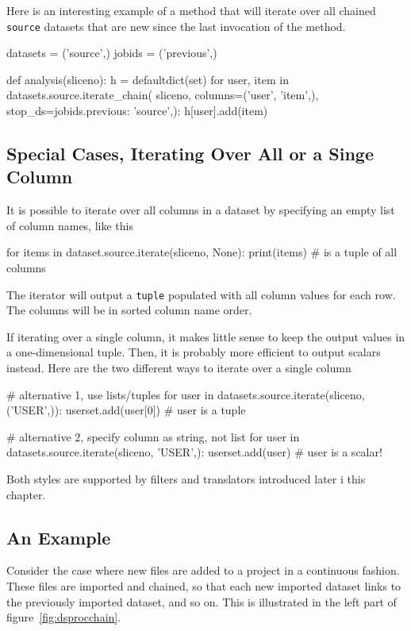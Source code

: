 Here is an interesting example of a method that will iterate over all
chained \texttt{source} datasets that are new since the last
invocation of the method.
\begin{python}
datasets = ('source',)
jobids = ('previous',)

def analysis(sliceno):
    h = defaultdict(set)
    for user, item in datasets.source.iterate_chain(
            sliceno,
            columns=('user', 'item',),
            stop_ds={jobids.previous: 'source',}):
        h[user].add(item)
\end{python}



\subsection*{Special Cases, Iterating Over All or a Singe Column}
It is possible to iterate over all columns in a dataset by specifying
an empty list of column names, like this
\begin{python}
for items in dataset.source.iterate(sliceno, None):
    print(items)  # is a tuple of all columns
\end{python}
The iterator will output a \texttt{tuple} populated with all column
values for each row.  The columns will be in sorted column name order.

If iterating over a single column, it makes little sense to keep the
output values in a one-dimensional tuple.  Then, it is probably more
efficient to output scalars instead.  Here are the two different ways
to iterate over a single column
\begin{python}
# alternative 1, use lists/tuples
for user in datasets.source.iterate(sliceno, ('USER',)):
    userset.add(user[0])  # user is a tuple

# alternative 2, specify column as string, not list
for user in datasets.source.iterate(sliceno, 'USER',):
    userset.add(user)     # user is a scalar!
\end{python}
Both styles are supported by filters and translators introduced later
i this chapter.



\subsection*{An Example}
Consider the case where new files are added to a project in a
continuous fashion.  These files are imported and chained, so that
each new imported dataset links to the previously imported dataset,
and so on.  This is illustrated in the left part of
figure~\ref{fig:dsprocchain}.

